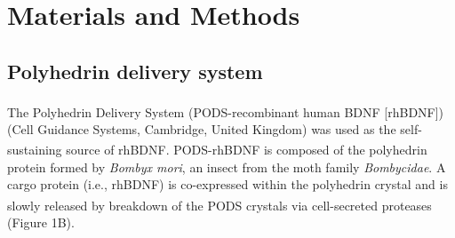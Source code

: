\documentclass[review]{elsarticle}
\begin{document}
\section{Materials and Methods}
\subsection{Polyhedrin delivery system}
The Polyhedrin Delivery System (PODS\textsuperscript{\textregistered}-recombinant human BDNF [rhBDNF]) (Cell Guidance Systems, Cambridge, United Kingdom) was used as the self-sustaining source of rhBDNF. PODS\textsuperscript{\textregistered}-rhBDNF is composed of the polyhedrin protein formed by \textit{Bombyx mori}, an insect from the moth family \textit{Bombycidae}. A cargo protein (i.e., rhBDNF) is co-expressed within the polyhedrin crystal and is slowly released by breakdown of the PODS\textsuperscript{\textregistered} crystals via cell-secreted proteases (Figure 1B)\cite{Chang2020, Suzuki1997, Guo2017}. 
\end{document}
